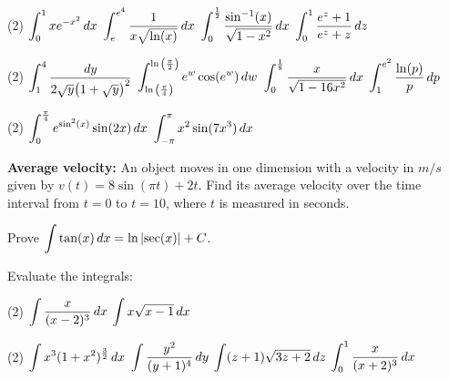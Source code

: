 \documentclass[mathNotesPreamble]{subfiles}
\begin{document}
  \begin{tasks}[after-item-skip=\stretch{1}, resume](2)
    \task $\ds\int_0^1 xe\inv[x^2]\,dx$
    \task $\ds\int_e^{e^4} \frac{1}{x\sqrt{\ln(x)}}\,dx$
    \task $\ds\int_0^{\frac{1}{2}} \frac{\sin\inv(x)}{\sqrt{1-x^2}}\,dx$
    \task $\ds\int_0^1 \frac{e^z+1}{e^z+z}\,dz$
  \end{tasks}
  \pagebreak
  
  \begin{tasks}[after-item-skip=\stretch{1}, resume](2)
    \task $\ds\int_1^4 \frac{dy}{2\sqrt{y}\parens{1+\sqrt{y}}^2}$
    \task $\ds\int_{\ln\parens{\frac{\pi}{4}}}^{\ln\parens{\frac{\pi}{2}}} e^w\cos(e^w)\,dw$
    \task $\ds\int_0^{\frac{1}{8}} \frac{x}{\sqrt{1-16x^2}}\,dx$
    \task $\ds\int_1^{e^2} \frac{\ln(p)}{p}\,dp$
  \end{tasks}
  \pagebreak
  
  \begin{tasks}[after-item-skip=\stretch{1}, resume](2)
    \task $\ds\int_0^{\frac{\pi}{4}} e^{\sin^2(x)}\sin(2x)\,dx$
    \task $\ds\int_{-\pi}^{\pi} x^2\sin(7x^3)\,dx$
  \end{tasks}
  \begin{ex*}
    \textbf{Average velocity:} An object moves in one dimension with a velocity in $m/s$ given by $v(t)=8\sin(\pi t)+2t$. Find its average velocity over the time interval from $t=0$ to $t=10$, where $t$ is measured in seconds.
  \end{ex*}
  \pagebreak
  
  \begin{ex*}
    Prove $\ds\int \tan(x)\,dx=\ln\abs{\sec(x)}+C$.
  \end{ex*}
  \begin{ex*}
    Evaluate the integrals:
  \end{ex*}
  \begin{tasks}[after-item-skip=\stretch{1}](2)
    \task $\ds\int \frac{x}{(x-2)^3}\,dx$
    \task $\ds\int x\sqrt{x-1}\,dx$
  \end{tasks}
  \pagebreak
  
  \begin{tasks}[after-item-skip=\stretch{1}, resume](2)
    \task $\ds\int x^3(1+x^2)^\frac{3}{2}\,dx$
    \task $\ds\int \frac{y^2}{(y+1)^4}\,dy$
    \task $\ds\int (z+1)\sqrt{3z+2}\,dz$
    \task $\ds\int_0^1 \frac{x}{(x+2)^3}\,dx$
  \end{tasks}
  \pagebreak
\end{document}
